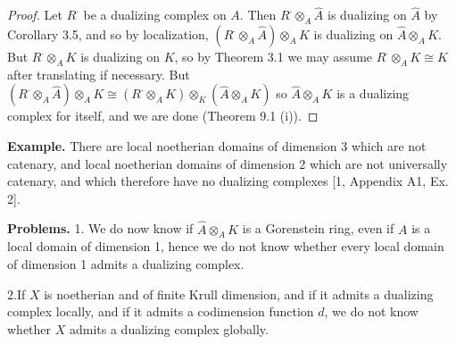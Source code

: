\documentclass[12pt]{book}
\begin{document}
\begin{proof}
Let \(R^{\cdot}\) be a dualizing complex on \(A\). Then \(R^{\cdot} \otimes_{A} \hat{A}\) is dualizing on \(\hat{A}\) by Corollary 3.5, and so by localization, \((R^{\cdot} \otimes_{A} \hat{A}) \otimes_{A} K\) is dualizing on \(\hat{A} \otimes_{A} K\). But \(R^{\cdot} \otimes_{A} K\) is dualizing on \(K\), so by Theorem 3.1 we may assume \(R^{\cdot} \otimes_{A} K \cong K\) after translating if necessary. But \((R^{\cdot} \otimes_{A} \hat{A}) \otimes_{A} K \cong (R^{\cdot} \otimes_{A} K) \otimes_{K}(\hat{A} \otimes_{A} K)\) so \(\hat{A} \otimes_{A} K\) is a dualizing complex for itself, and we are done (Theorem 9.1 (i)).
\end{proof}

\setcounter{page}{301}
\textbf{Example.}
There are local noetherian domains of dimension 3 which are not catenary, and local noetherian domains of dimension 2 which are not universally catenary, and which therefore have no dualizing complexes [1, Appendix A1, Ex. 2].

\textbf{Problems.}
1. We do now know if \(\hat{A} \otimes_{A} K\) is a Gorenstein ring, even if \(A\) is a local domain of dimension 1, hence we do not know whether every local domain of dimension 1 admits a dualizing complex.

2.If \(X\) is noetherian and of finite Krull dimension, and if it admits a dualizing complex locally, and if it admits a codimension function \(d\), we do not know whether \(X\) admits a dualizing complex globally.
\end{document}
